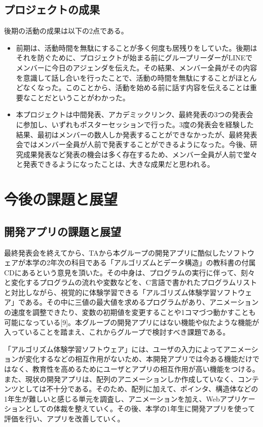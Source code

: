 \documentclass[openany,11pt,papersize]{jsbook}
\begin{document}
\section{プロジェクトの成果}
\par 後期の活動の成果は以下の2点である。
\begin{itemize}
\item 前期は、活動時間を無駄にすることが多く何度も居残りをしていた。後期はそれを防ぐために、プロジェクトが始まる前にグループリーダーがLINEでメンバーに今日のアジェンダを伝えた。その結果、メンバー全員がその内容を意識して話し合いを行ったことで、活動の時間を無駄にすることがほとんどなくなった。このことから、活動を始める前に話す内容を伝えることは重要なことだということがわかった。
\item 
本プロジェクトは中間発表、アカデミックリンク、最終発表の3つの発表会に参加し、いずれもポスターセッションで行った。3度の発表会を経験した結果、最初はメンバーの数人しか発表することができなかったが、最終発表会ではメンバー全員が人前で発表することができるようになった。今後、研究成果発表など発表の機会は多く存在するため、メンバー全員が人前で堂々と発表できるようになったことは、大きな成果だと思われる。
\end{itemize}



\chapter{今後の課題と展望}
\section{開発アプリの課題と展望}
最終発表会を終えてから、TAから本グループの開発アプリに酷似したソフトウェアが本学の2年次の科目である「アルゴリズムとデータ構造」の教科書の付属CDにあるという意見を頂いた。その中身は、プログラムの実行に伴って、刻々と変化するプログラムの流れや変数などを、C言語で書かれたプログラムリストと対比しながら、視覚的に体験学習できる「アルゴリズム体験学習ソフトウェア」である。その中に三値の最大値を求めるプログラムがあり、アニメーションの速度を調整できたり、変数の初期値を変更することや1コマづつ動かすことも可能になっている[9]。本グループの開発アプリにはない機能や似たような機能が入っていることを踏まえ、これからグループで検討すべき課題である。

\par
「アルゴリズム体験学習ソフトウェア」には、ユーザの入力によってアニメーションが変化するなどの相互作用がないため、本開発アプリでは今ある機能だけではなく、教育性を高めるためにユーザとアプリの相互作用が高い機能をつける。また、現状の開発アプリは、配列のアニメーションしか作成していなく、コンテンツとしては不十分である。そのため、配列に加えて、ポインタ、構造体などの1年生が難しいと感じる単元を調査し、アニメーションを加え、Webアプリケーションとしての体裁を整えていく。その後、本学の1年生に開発アプリを使って評価を行い、アプリを改善していく。
\end{document}
